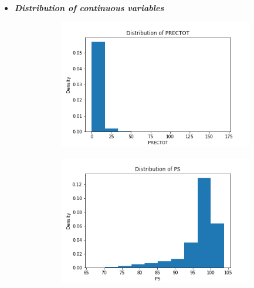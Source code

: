 \documentclass{article}
\begin{document}
\begin{itemize}
            
   \item \textit{\textbf{{Distribution of continuous variables}}}
            \begin{figure}[htbp]
            \centering
            \begin{subfigure}{0.3\textwidth}
                \centering
                \includegraphics[width=\linewidth]{pic/hist/Distribution PRECTOT .png}
            \end{subfigure}
            \begin{subfigure}{0.3\textwidth}
                \centering
                \includegraphics[width=\linewidth]{pic/hist/Distribution PS .png}
            \end{subfigure}
            \begin{subfigure}{0.3\textwidth}
                \centering

\end{subfigure}
\end{figure}
\end{itemize}
\end{document}
